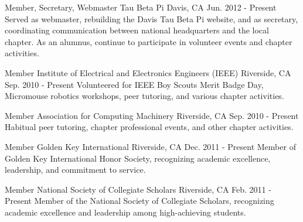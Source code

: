 

\begin{cventries}

\cventry
    {Member, Secretary, Webmaster} %
    {Tau Beta Pi} %
    {Davis, CA} %
    {Jun. 2012 - Present} %
    {Served as webmaster, rebuilding the Davis Tau Beta Pi website, and as secretary, coordinating communication between national headquarters and the local chapter. As an alumnus, continue to participate in volunteer events and chapter activities.} %
    {}

\cventry
    {Member} %
    {Institute of Electrical and Electronics Engineers (IEEE)} %
    {Riverside, CA} %
    {Sep. 2010 - Present} %
    {Volunteered for IEEE Boy Scouts Merit Badge Day, Micromouse robotics workshops, peer tutoring, and various chapter activities.} %
    {}

\cventry
    {Member} %
    {Association for Computing Machinery} %
    {Riverside, CA} %
    {Sep. 2010 - Present} %
    {Habitual peer tutoring, chapter professional events, and other chapter activities.} %
    {}

\cventry
    {Member} %
    {Golden Key International} %
    {Riverside, CA} %
    {Dec. 2011 - Present} %
    {Member of Golden Key International Honor Society, recognizing academic excellence, leadership, and commitment to service.} %
    {}

\cventry
    {Member} %
    {National Society of Collegiate Scholars} %
    {Riverside, CA} %
    {Feb. 2011 - Present} %
    {Member of the National Society of Collegiate Scholars, recognizing academic excellence and leadership among high-achieving students.} %
    {}

\end{cventries}